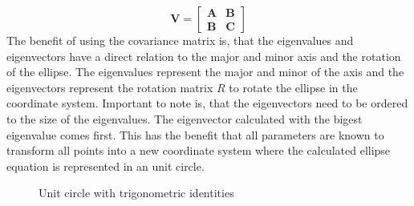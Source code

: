 \begin{equation}
    \mathbf{V} = \begin{bmatrix}
        \mathbf{A} & \mathbf{B} \\
        \mathbf{B} & \mathbf{C} 
    \label{covariance}
    \end{bmatrix}
\end{equation}
The benefit of using the covariance matrix is, that the eigenvalues and eigenvectors have a direct relation to the major and minor axis and the rotation of the ellipse. The eigenvalues represent the major and minor of the axis and the eigenvectors represent the rotation matrix $R$ to rotate the ellipse in the coordinate system. Important to note is, that the eigenvectors need to be ordered to the size of the eigenvalues. The eigenvector calculated with the bigest eigenvalue comes first. This has the benefit that all parameters are known to transform all points into a new coordinate system where the calculated ellipse equation is represented in an unit circle.

\begin{figure}[h]
    \centering
    \caption{Unit circle with trigonometric identities}
    \label{fig:unit_circle}
\end{figure}

